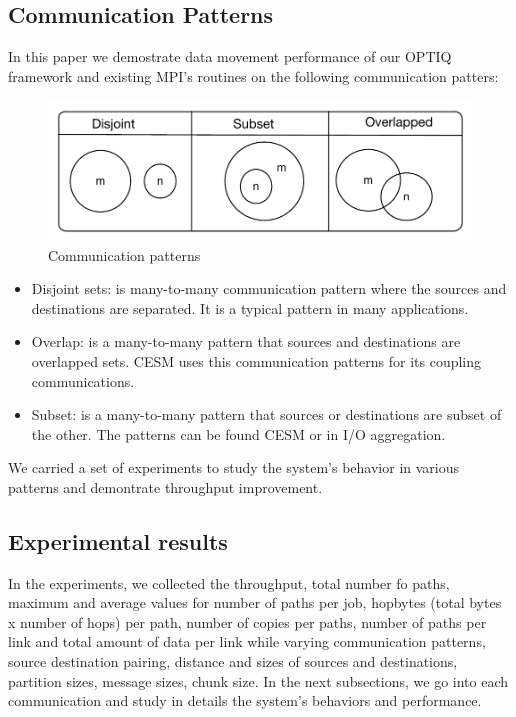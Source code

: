 \subsection{Communication Patterns}
In this paper we demostrate data movement performance of our OPTIQ framework and existing MPI's routines on the following communication patters:

\begin{figure}[ht]
\vspace{-0.1in}
\centering
\includegraphics[scale=0.55]{figures/patterns.pdf}
\vspace{-0.1in}
\caption{Communication patterns}
\vspace{-0.1in}
\label{fig:patterns}
\end{figure}

\begin{itemize}
\item Disjoint sets: is many-to-many communication pattern where the sources and destinations are separated. It is a typical pattern in many applications.
\item Overlap: is a many-to-many pattern that sources and destinations are overlapped sets. CESM uses this communication patterns for its coupling communications.
\item Subset: is a many-to-many pattern that sources or destinations are subset of the other. The patterns can be found CESM or in I/O aggregation.
\end{itemize}

We carried a set of experiments to study the system's behavior in various patterns and demontrate throughput improvement.

\subsection{Experimental results}

In the experiments, we collected the throughput, total number fo paths, maximum and average values for number of paths per job, hopbytes (total bytes x number of hops) per path, number of copies per paths, number of paths per link and total amount of data per link while varying communication patterns, source destination pairing, distance and sizes of sources and destinations, partition sizes, message sizes, chunk size.
In the next subsections, we go into each communication and study in details the system's behaviors and performance.


